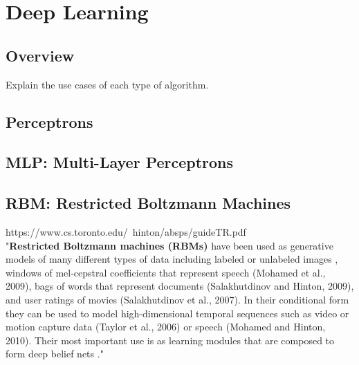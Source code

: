 \section{Deep Learning}

\subsection{Overview}

Explain the use cases of each type of algorithm. 

\subsection{Perceptrons}

\subsection{MLP: Multi-Layer Perceptrons}

\subsection{RBM: Restricted Boltzmann Machines}

https://www.cs.toronto.edu/~hinton/absps/guideTR.pdf \\

"\textbf{Restricted Boltzmann machines (RBMs)} have been used as generative models of many different types of data including labeled or unlabeled images \cite{Hinton:2006:FLA:1161603.1161605}, windows of mel-cepstral coefficients that represent speech (Mohamed et al., 2009), bags of words that represent documents (Salakhutdinov and Hinton, 2009), and user ratings of movies (Salakhutdinov et al., 2007). In their conditional form they can be used to model high-dimensional temporal sequences such as video or motion capture data (Taylor et al., 2006) or speech (Mohamed and Hinton, 2010). Their most important use is as learning modules that are composed to form deep belief nets \cite{Hinton:2006:FLA:1161603.1161605}." \\

